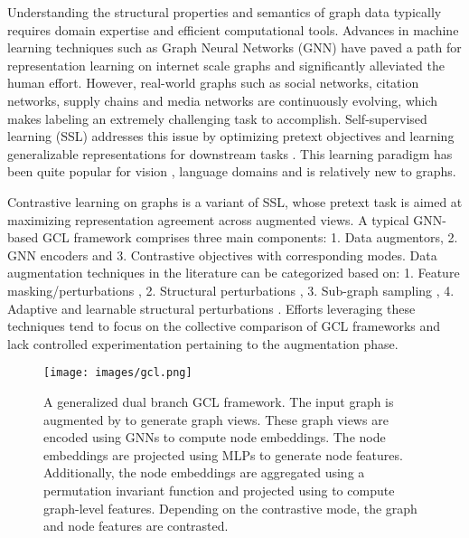 \documentclass{article}
\theoremstyle{plain}
\theoremstyle{definition}
\theoremstyle{remark}
\begin{document}
Understanding the structural properties and semantics of graph data typically requires domain expertise and efficient computational tools.  Advances in machine learning techniques such as Graph Neural Networks (GNN) \citep{gori2005new, scarselli2008graph, bruna2014spectral, henaff2015deep, welling2016semi, niepert2016learning, bronstein2017geometric, xu2018powerful, wu2020comprehensive, zhou2020graph} have paved a path for representation learning on internet scale graphs and significantly alleviated the human effort. However, real-world graphs such as social networks, citation networks, supply chains and media networks are continuously evolving, which makes labeling an extremely challenging task to accomplish. Self-supervised learning (SSL) addresses this issue by optimizing pretext objectives and learning generalizable representations for downstream tasks \citep{jin2020self, wu2021self, liu2022graph, xie2022self}. This learning paradigm has been quite popular for vision \citep{gidaris2018unsupervised, hjelm2018learning, chen2020simple, jing2020self}, language domains \citep{mikolov2013efficient, devlin2018bert, radford2018improving, lan2019albert} and is relatively new to graphs.

Contrastive learning on graphs \citep{velickovic2019deep, sun2019infograph, zhu2020deep, you2020graph, hassani2020contrastive} is a variant of SSL, whose pretext task is aimed at maximizing representation agreement across augmented views. A typical GNN-based GCL framework comprises three main components: 1. Data augmentors, 2. GNN encoders and 3. Contrastive objectives with corresponding modes. Data augmentation techniques in the literature can be categorized based on: 1. Feature masking/perturbations \citep{you2020graph, thakoor2021bootstrapped}, 2. Structural perturbations \citep{you2020graph, hassani2020contrastive, zeng2021contrastive}, 3. Sub-graph sampling \citep{hu2019strategies, qiu2020gcc, jiao2020sub, zhu2021transfer}, 4. Adaptive and learnable structural perturbations \citep{zhu2021graph, yin2022autogcl}. Efforts leveraging these techniques tend to focus on the collective comparison of GCL frameworks and lack controlled experimentation pertaining to the augmentation phase. 

\begin{figure*}[ht]
\vskip 0.2in
\begin{center}
\centerline{\texttt{[image: images/gcl.png]}}
\caption{A generalized dual branch GCL framework. The input graph  is augmented by  to generate graph views. These graph views are encoded using GNNs  to compute node embeddings. The node embeddings are projected using MLPs  to generate node features. Additionally, the node embeddings are aggregated using a permutation invariant function  and projected using  to compute graph-level features. Depending on the contrastive mode, the graph and node features are contrasted.} 
\label{fig:gcl}
\end{center}
\vskip -0.2in
\end{figure*}
\end{document}
